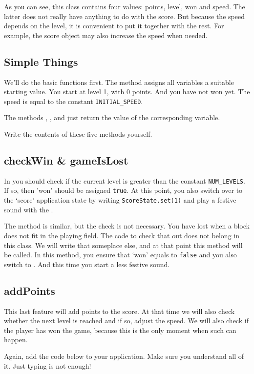 As you can see, this class contains four values: points, level, won and speed. The latter does not really have anything to do with the score. But because the speed depends on the level, it is convenient to put it together with the rest. For example, the score object may also increase the speed when needed.

\subsection{Simple Things}
We'll do the basic functions first. The  method assigns all variables a suitable starting value. You start at level 1, with 0 points. And you have not won yet. The speed is equal to the constant \verb|INITIAL_SPEED|.

The methods , ,  and  just return the value of the corresponding variable.

Write the contents of these five methods yourself.

\subsection{checkWin \& gameIsLost}
In  you should check if the current level is greater than the constant \verb|NUM_LEVELS|. If so, then 'won' should be assigned \verb|true|. At this point, you also switch over to the `score' application state by writing \verb|ScoreState.set(1)| and play a festive sound with the .

The method  is similar, but the check is not necessary. You have lost when a block does not fit in the playing field. The code to check that out does not belong in this class. We will write that someplace else, and at that point this method will be called. In this method, you ensure that `won' equals to \verb|false| and you also switch to . And this time you start a less festive sound.

\subsection{addPoints}
This last feature will add points to the score. At that time we will also check whether the next level is reached and if so, adjust the speed. We will also check if the player has won the game, because this is the only moment when such can happen.

Again, add the code below to your application. Make sure you understand all of it. Just typing is not enough!

